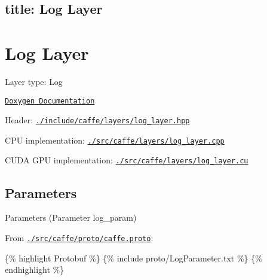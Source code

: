 

 \subsection*{title\+: Log Layer }

\section*{Log Layer}


\begin{DoxyItemize}
\item Layer type\+: {\ttfamily Log}
\item \href{http://caffe.berkeleyvision.org/doxygen/classcaffe_1_1LogLayer.html}{\tt Doxygen Documentation}
\item Header\+: \href{https://github.com/BVLC/caffe/blob/master/include/caffe/layers/log_layer.hpp}{\tt {\ttfamily ./include/caffe/layers/log\+\_\+layer.hpp}}
\item C\+PU implementation\+: \href{https://github.com/BVLC/caffe/blob/master/src/caffe/layers/log_layer.cpp}{\tt {\ttfamily ./src/caffe/layers/log\+\_\+layer.cpp}}
\item C\+U\+DA G\+PU implementation\+: \href{https://github.com/BVLC/caffe/blob/master/src/caffe/layers/log_layer.cu}{\tt {\ttfamily ./src/caffe/layers/log\+\_\+layer.cu}}
\end{DoxyItemize}

\subsection*{Parameters}


\begin{DoxyItemize}
\item Parameters ({\ttfamily Parameter log\+\_\+param})
\item From \href{https://github.com/BVLC/caffe/blob/master/src/caffe/proto/caffe.proto}{\tt {\ttfamily ./src/caffe/proto/caffe.proto}}\+:
\end{DoxyItemize}

\{\% highlight Protobuf \%\} \{\% include proto/\+Log\+Parameter.\+txt \%\} \{\% endhighlight \%\} 